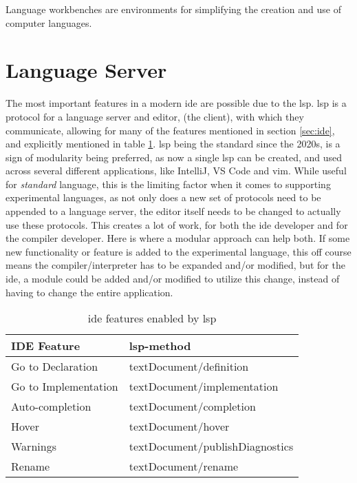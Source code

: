 Language workbenches are environments for simplifying the creation and use of
computer languages. \cite{lwb}


\section{Language Server}

The most important features in a modern \gls{ide} are possible due to the
\gls{lsp}. \gls{lsp} is a protocol for a language server and editor,
(the client), with which they communicate, allowing for many of the features
mentioned in section \ref{sec:ide}, and explicitly mentioned in table
\ref{tbl:ide}. \gls{lsp} being the standard since the 2020s, is a sign of
modularity being preferred, as now a single \gls{lsp} can be created, and used
across several different applications, like IntelliJ, VS Code and \gls{vim}.
While useful for \textit{standard} language, this is the limiting factor when it
comes to supporting experimental languages, as not only does a new set of
protocols need to be appended to a language server, the editor itself needs to
be changed to actually use these protocols. This creates a lot of work, for both
the \gls{ide} developer and for the compiler developer. Here is where a modular
approach can help both. If some new functionality or feature is added to the
experimental language, this off course means the compiler/interpreter has to be
expanded and/or modified, but for the \gls{ide}, a module could be added and/or
modified to utilize this change, instead of having to change the entire
application.

\begin{table}[]
  \centering
  \caption{\gls{ide} features enabled by \gls{lsp}}
  \label{tbl:ide}
  \begin{tabular}{|l|l|}
    \hline
    IDE Feature & \gls{lsp}-method \\ \hline
    Go to Declaration & textDocument/definition \\ \hline
    Go to Implementation & textDocument/implementation \\ \hline
    Auto-completion & textDocument/completion \\ \hline
    Hover & textDocument/hover \\ \hline
    Warnings & textDocument/publishDiagnostics \\ \hline
    Rename & textDocument/rename \\ \hline
  \end{tabular}
\end{table}


